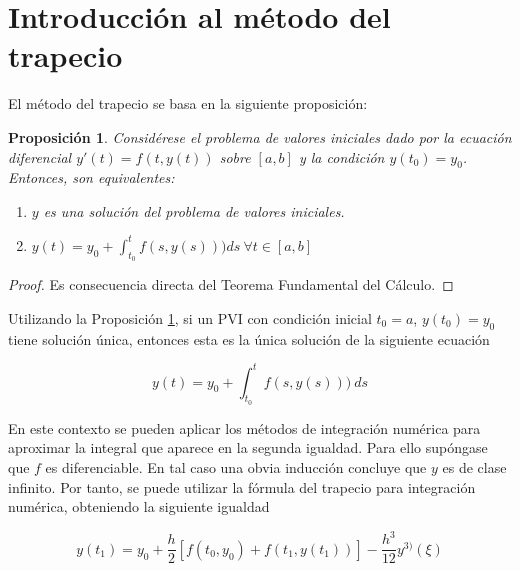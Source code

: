 \documentclass{article}
\theoremstyle{theorem-style}  %
\newtheorem{proposition}[theorem]{Proposición}
\theoremstyle{definition}
\theoremstyle{example-style}
\begin{document}

\section{Introducción al método del trapecio} \label{sec:intro-trapecio}

	El método del trapecio se basa en la siguiente proposición:

	\begin{proposition} \label{prop:sol-eq}
		Considérese el problema de valores iniciales dado por la ecuación diferencial $y'(t) = f(t,y(t))$ sobre $[a,b]$ y la condición $y(t_0) = y_0$.  Entonces, son equivalentes:
		\begin{enumerate}
			\item $y$ es una solución del problema de valores iniciales.
			\item $y(t) = y_0 + \int_{t_0}^{t} f(s,y(s))) ds \ \forall t \in [a,b]$
		\end{enumerate}
	\end{proposition}
	
	\begin{proof}
		Es consecuencia directa del Teorema Fundamental del Cálculo.
	\end{proof}

	
	Utilizando la Proposición \ref{prop:sol-eq}, si un PVI con condición inicial $t_0 = a$, $y(t_0) = y_0$ tiene solución única, entonces esta es la única solución de la siguiente ecuación
	
	\begin{equation}
		y(t)  = y_0 + \int_{t_0}^{t} f(s,y(s))) \ ds
	\end{equation}
	
	En este contexto se pueden aplicar los métodos de integración numérica para aproximar la integral que aparece en la segunda igualdad. Para ello supóngase que $f$ es diferenciable. En tal caso una obvia inducción concluye que $y$ es de clase infinito. Por tanto, se puede utilizar la fórmula del trapecio para integración numérica, obteniendo la siguiente igualdad
	
	\begin{equation} \label{eq:trapecio-igualdad}
		y(t_{1}) = y_0 + \frac{h}{2} \left[f(t_0,y_0) + f(t_1, y(t_1))\right] - \frac{h^3}{12}y^{3)}(\xi)
	\end{equation}
\end{document}
